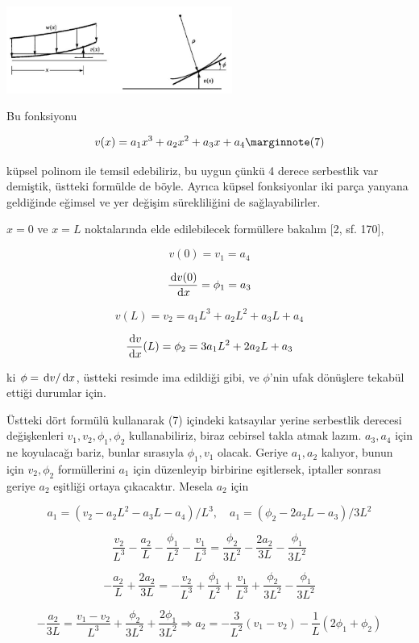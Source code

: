 \documentclass[12pt,fleqn]{article}\usepackage{../../common}
\begin{document}
\includegraphics[width=20em]{phy_020_strs_05_09.jpg}

Bu fonksiyonu

$$
v(x) = a_1 x^3 + a_2 x^2 + a_3 x + a_4
\mlabel{7}
$$

küpsel polinom ile temsil edebiliriz, bu uygun çünkü 4 derece serbestlik var
demiştik, üstteki formülde de böyle. Ayrıca küpsel fonksiyonlar iki parça
yanyana geldiğinde eğimsel ve yer değişim sürekliliğini de sağlayabilirler.

$x=0$ ve $x=L$ noktalarında elde edilebilecek formüllere bakalım [2, sf. 170],

$$
v(0) = v_1 = a_4
$$

$$
\frac{\,\mathrm{d} v(0)}{\,\mathrm{d} x} = \phi_1 = a_3
$$

$$
v(L) = v_2 = a_1 L^3 + a_2 L^2 + a_3 L + a_4 
$$

$$
\frac{\,\mathrm{d} v}{\,\mathrm{d} x}(L) = \phi_2 = 3 a_1 L^2 + 2 a_2 L + a_3
$$

ki $\phi = \,\mathrm{d} v / \,\mathrm{d} x$, üstteki resimde ima edildiği gibi, ve $\phi$'nin
ufak dönüşlere tekabül ettiği durumlar için.

Üstteki dört formülü kullanarak (7) içindeki katsayılar yerine serbestlik
derecesi değişkenleri $v_1,v_2,\phi_1,\phi_2$ kullanabiliriz, biraz cebirsel
takla atmak lazım. $a_3,a_4$ için ne koyulacağı bariz, bunlar sırasıyla
$\phi_1,v_1$ olacak. Geriye $a_1,a_2$ kalıyor, bunun için $v_2,\phi_2$
formüllerini $a_1$ için düzenleyip birbirine eşitlersek, iptaller sonrası
geriye $a_2$ eşitliği ortaya çıkacaktır. Mesela $a_2$ için

$$
a_1 = (v_2 - a_2 L^2 - a_3L - a_4) / L^3, \quad
a_1 = (\phi_2 - 2a_2 L - a_3) / 3L^2
$$

$$
\frac{v_2}{L^3} - \frac{a_2}{L} - \frac{\phi_1}{L^2} - \frac{v_1}{L^3} =
\frac{\phi_2}{3L^2} - \frac{2a_2}{3L} - \frac{\phi_1}{3L^2}
$$

$$
-\frac{a_2}{L} + \frac{2a_2}{3L} =
-\frac{v_2}{L^3} + \frac{\phi_1}{L^2} + \frac{v_1}{L^3} + \frac{\phi_2}{3L^2} - \frac{\phi_1}{3L^2}
$$

$$
-\frac{a_2}{3L} = \frac{v_1 - v_2}{L^3} + \frac{\phi_2}{3L^2} + \frac{2 \phi_1}{3L^2}
\Rightarrow a_2 = -\frac{3}{L^2} (v_1-v_2) - \frac{1}{L} (2\phi_1 + \phi_2)
$$
\end{document}
